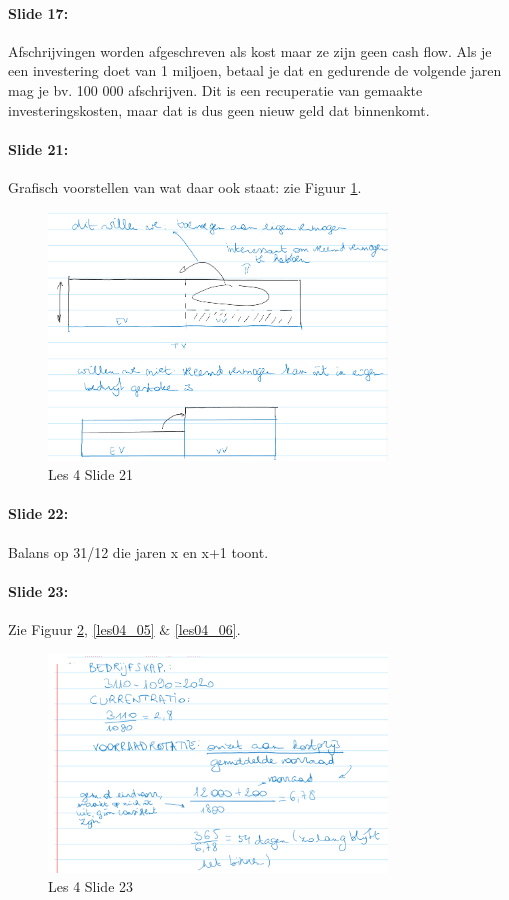 \documentclass[10pt,a4paper]{report}
\begin{document}
\paragraph{Slide 17:} Afschrijvingen worden afgeschreven als kost maar ze zijn geen cash flow. Als je een investering doet van 1 miljoen, betaal je dat en gedurende de volgende jaren mag je bv. 100 000 afschrijven. Dit is een recuperatie van gemaakte investeringskosten, maar dat is dus geen nieuw geld dat binnenkomt.

\paragraph{Slide 21:} Grafisch voorstellen van wat daar ook staat: zie Figuur \ref{les04_03}.

\begin{figure}[h!]
\centering
\includegraphics[width=90mm]{Les04_03.png}
\caption{Les 4 Slide 21} 
\label{les04_03}
\end{figure}

\paragraph{Slide 22:} Balans op 31/12 die jaren x en x+1 toont.

\paragraph{Slide 23:} Zie Figuur \ref{les04_04}, \ref{les04_05} $\&$ \ref{les04_06}.

\begin{figure}[h!]
\centering
\includegraphics[width=90mm]{Les04_04.png}
\caption{Les 4 Slide 23} 
\label{les04_04}
\end{figure}
\end{document}
